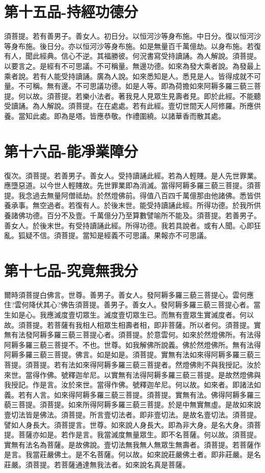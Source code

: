 \documentclass[a6paper, 22pt, twocolumn]{cvertbook}
\begin{document}
\chapter{第十五品-持經功德分}
\large 須菩提。若有善男子。善女人。初日分。以恒河沙等身布施。中日分。復以恒河沙等身布施。後日分。亦以恒河沙等身布施。如是無量百千萬億劫。以身布施。若復有人，聞此經典。信心不逆。其福勝彼。何況書寫受持讀誦。為人解說。須菩提。以要言之。是經有不可思議。不可稱量。無邊功德。如來為發大乘者說。為發最上乘者說。若有人能受持讀誦。廣為人說。如來悉知是人。悉見是人。皆得成就不可量。不可稱。無有邊。不可思議功德。如是人等。即為荷擔如來阿耨多羅三藐三菩提。何以故。須菩提。若樂小法者。著我見人見眾生見壽者見。即於此經。不能聽受讀誦。為人解說。須菩提。在在處處。若有此經。壹切世間天人阿修羅。所應供養。當知此處。即為是塔。皆應恭敬。作禮圍繞。以諸華香而散其處。
\chapter{第十六品-能凈業障分}
\large 復次。須菩提。若善男子。善女人。受持讀誦此經。若為人輕賤。是人先世罪業。應墮惡道。以今世人輕賤故。先世罪業即為消滅。當得阿耨多羅三藐三菩提。須菩提。我念過去無量阿僧祗劫。於然燈佛前。得值八百四千萬億那由他諸佛。悉皆供養承事。無空過者。若復有人。於後末世。能受持讀誦此經。所得功德。於我所供養諸佛功德。百分不及壹。千萬億分乃至算數譬喻所不能及。須菩提。若善男子。善女人。於後末世。有受持讀誦此經。所得功德。我若具說者。或有人聞。心即狂亂。狐疑不信。須菩提。當知是經義不可思議。果報亦不可思議。
\chapter{第十七品-究竟無我分}
\large 爾時須菩提白佛言。世尊。善男子。善女人。發阿耨多羅三藐三菩提心。雲何應住?雲何降伏其心?佛告須菩提。善男子。善女人。發阿耨多羅三藐三菩提心者。當生如是心。我應滅度壹切眾生。滅度壹切眾生已。而無有壹眾生實滅度者。何以故。須菩提。若菩薩有我相人相眾生相壽者相，即非菩薩。所以者何。須菩提。實無有法發阿耨多羅三藐三菩提心者。須菩提。於意雲何。如來於然燈佛所。有法得阿耨多羅三藐三菩提不。不也。世尊。如我解佛所說義。佛於然燈佛所。無有法得阿耨多羅三藐三菩提。佛言。如是如是。須菩提。實無有法如來得阿耨多羅三藐三菩提。須菩提。若有法如來得阿耨多羅三藐三菩提者。然燈佛則不與我授記。汝於來世。當得作佛。號釋迦牟尼。以實無有法得阿耨多羅三藐三菩提。是故然燈佛與我授記。作是言。汝於來世。當得作佛。號釋迦牟尼。何以故。如來者。即諸法如義。若有人言。如來得阿耨多羅三藐三菩提。須菩提。實無有法。佛得阿耨多羅三藐三菩提。須菩提。如來所得阿耨多羅三藐三菩提。於是中無實無虛。是故如來說壹切法皆是佛法。須菩提。所言壹切法者。即非壹切法。是故名壹切法。須菩提。譬如人身長大。須菩提言。世尊。如來說人身長大。即為非大身。是名大身。須菩提。菩薩亦如是。若作是言。我當滅度無量眾生。即不名菩薩。何以故。須菩提。實無有法名為菩薩。是故佛說。壹切法無我無人無眾生無壽者。須菩提。若菩薩作是言。我當莊嚴佛土。是不名菩薩。何以故。如來說莊嚴佛土者。即非莊嚴。是名莊嚴。須菩提。若菩薩通達無我法者。如來說名真是菩薩。
\end{document}
